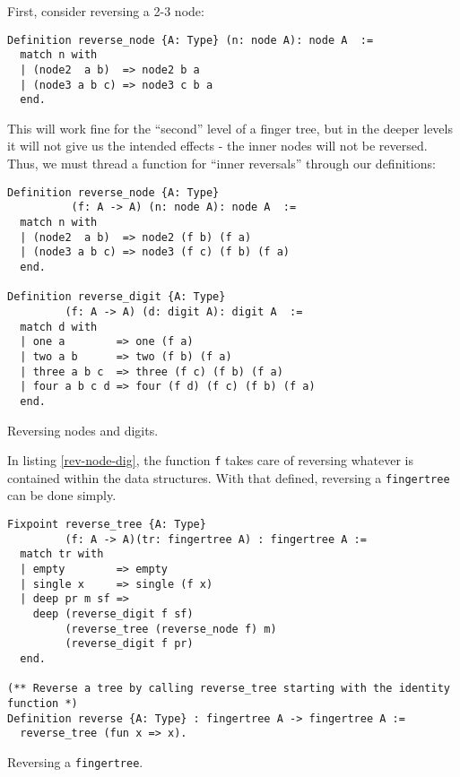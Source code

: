 \documentclass{article}
\newcommand{\code}[1]{\texttt{#1}}
\begin{document}
First, consider reversing a 2-3 node:
\begin{listing}[H]
\begin{verbatim}
Definition reverse_node {A: Type} (n: node A): node A  :=
  match n with
  | (node2  a b)  => node2 b a
  | (node3 a b c) => node3 c b a
  end.
\end{verbatim}
\end{listing}

This will work fine for the ``second'' level of a finger tree, but in the deeper
levels it will not give us the intended effects - the inner nodes will not
be reversed. Thus, we must thread a function for ``inner reversals'' through
our definitions:
\begin{listing}[H]
\begin{verbatim}
Definition reverse_node {A: Type}
          (f: A -> A) (n: node A): node A  :=
  match n with
  | (node2  a b)  => node2 (f b) (f a)
  | (node3 a b c) => node3 (f c) (f b) (f a)
  end.

Definition reverse_digit {A: Type}
         (f: A -> A) (d: digit A): digit A  :=
  match d with
  | one a        => one (f a)
  | two a b      => two (f b) (f a)
  | three a b c  => three (f c) (f b) (f a)
  | four a b c d => four (f d) (f c) (f b) (f a)
  end.
\end{verbatim}
\caption{Reversing nodes and digits.}
\label{rev-node-dig}
\end{listing}

In listing \ref{rev-node-dig}, the function \code{f} takes care of reversing
whatever is contained within the data structures. With that defined, reversing
a \code{fingertree} can be done simply.

\begin{listing}[H]
\begin{verbatim}
Fixpoint reverse_tree {A: Type}
         (f: A -> A)(tr: fingertree A) : fingertree A :=
  match tr with
  | empty        => empty
  | single x     => single (f x)
  | deep pr m sf =>
    deep (reverse_digit f sf)
         (reverse_tree (reverse_node f) m)
         (reverse_digit f pr)
  end.

(** Reverse a tree by calling reverse_tree starting with the identity function *)
Definition reverse {A: Type} : fingertree A -> fingertree A :=
  reverse_tree (fun x => x).
\end{verbatim}
\caption{Reversing a \code{fingertree}.}
\label{rev-fingertree}
\end{listing}
\end{document}

